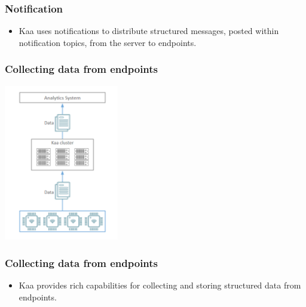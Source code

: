 \documentclass{beamer}
\begin{document}
\begin{frame}
	\frametitle{Notification}
	\begin{itemize}
		\item Kaa uses notifications to distribute structured messages,
			posted within notification topics,
			from the \textcolor{TextOrange}{server} to \textcolor{TextGreen}{endpoints}.
	\end{itemize}
\end{frame}

\begin{frame}
	\frametitle{Collecting data from endpoints}
	\centering\includegraphics[width=5cm]{figs/collecting_data.png}
\end{frame}
\begin{frame}
	\frametitle{Collecting data from endpoints}
	\begin{itemize}
		\item Kaa provides rich capabilities for
			\textcolor{Ocean}{collecting} and \textcolor{TextOrange}{storing} structured data from endpoints.
	\end{itemize}
\end{frame}
\end{document}
